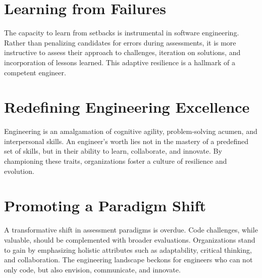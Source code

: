 \documentclass[
    a4paper, %
    10pt, %
    unnumberedsections, %
    twoside, %
]{LTJournalArticle}
\begin{document}
\section{Learning from Failures}

The capacity to learn from setbacks is instrumental in software engineering. Rather than penalizing candidates for errors during assessments, it is more instructive to assess their approach to challenges, iteration on solutions, and incorporation of lessons learned. This adaptive resilience is a hallmark of a competent engineer.


\section{Redefining Engineering Excellence}

Engineering is an amalgamation of cognitive agility, problem-solving acumen, and interpersonal skills. An engineer's worth lies not in the mastery of a predefined set of skills, but in their ability to learn, collaborate, and innovate. By championing these traits, organizations foster a culture of resilience and evolution.

\section{Promoting a Paradigm Shift}

A transformative shift in assessment paradigms is overdue. Code challenges, while valuable, should be complemented with broader evaluations. Organizations stand to gain by emphasizing holistic attributes such as adaptability, critical thinking, and collaboration. The engineering landscape beckons for engineers who can not only code, but also envision, communicate, and innovate.
\end{document}
